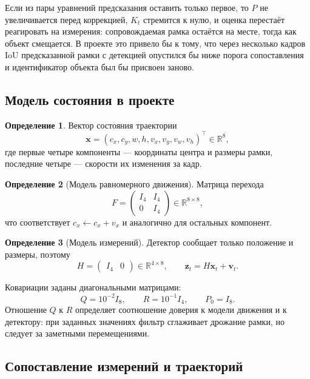 \documentclass[11pt,a4paper]{article}
\theoremstyle{definition}
\newtheorem{definition}{Определение}[section]
\theoremstyle{remark}
\begin{document}
Если из пары уравнений предсказания оставить только первое, то $P$ не
увеличивается перед коррекцией, $K_t$ стремится к нулю, и оценка перестаёт
реагировать на измерения: сопровождаемая рамка остаётся на месте, тогда как
объект смещается. В проекте это привело бы к тому, что через несколько кадров
$\mathrm{IoU}$ предсказанной рамки с детекцией опустился бы ниже порога
сопоставления и идентификатор объекта был бы присвоен заново.

\subsection{Модель состояния в проекте}

\begin{definition}
Вектор состояния траектории
\[
  \mathbf{x} = (c_x, c_y, w, h, v_x, v_y, v_w, v_h)^\top \in \mathbb{R}^8,
\]
где первые четыре компоненты --- координаты центра и размеры рамки, последние
четыре --- скорости их изменения за кадр.
\end{definition}

\begin{definition}[Модель равномерного движения]
Матрица перехода
\[
  F = \begin{pmatrix} I_4 & I_4 \\ 0 & I_4 \end{pmatrix} \in
  \mathbb{R}^{8 \times 8},
\]
что соответствует $c_x \leftarrow c_x + v_x$ и аналогично для остальных
компонент.
\end{definition}

\begin{definition}[Модель измерений]
Детектор сообщает только положение и размеры, поэтому
\[
  H = \begin{pmatrix} I_4 & 0 \end{pmatrix} \in \mathbb{R}^{4 \times 8},
  \qquad \mathbf{z}_t = H \mathbf{x}_t + \mathbf{v}_t .
\]
\end{definition}

Ковариации заданы диагональными матрицами:
\[
  Q = 10^{-2} I_8, \qquad R = 10^{-1} I_4, \qquad P_0 = I_8 .
\]
Отношение $Q$ к $R$ определяет соотношение доверия к модели движения и к
детектору: при заданных значениях фильтр сглаживает дрожание рамки, но
следует за заметными перемещениями.

\subsection{Сопоставление измерений и траекторий}
\end{document}
